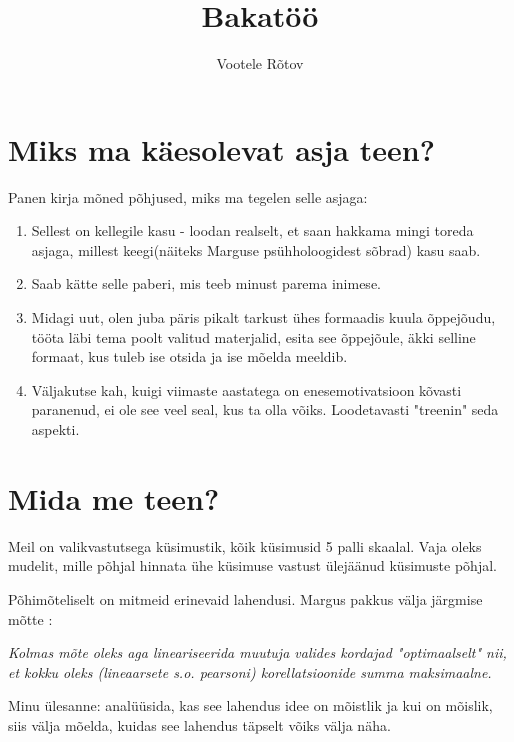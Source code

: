 \documentclass{article}
\author{Vootele Rõtov}
\title{Bakatöö}
\begin{document}
\section*{Miks ma käesolevat asja teen?}

Panen kirja mõned põhjused, miks ma tegelen selle asjaga:
\begin{enumerate}[I]
\item Sellest on kellegile kasu - loodan realselt, et saan hakkama mingi toreda asjaga, millest keegi(näiteks Marguse psühholoogidest sõbrad) kasu saab.
\item Saab kätte selle paberi, mis teeb minust parema inimese. 
\item Midagi uut, olen juba päris pikalt tarkust ühes formaadis kuula õppejõudu, tööta läbi tema poolt valitud materjalid, esita see õppejõule, äkki selline formaat, kus tuleb ise otsida ja ise mõelda meeldib.
\item Väljakutse kah, kuigi viimaste aastatega on enesemotivatsioon kõvasti paranenud, ei ole see veel seal, kus ta olla võiks. Loodetavasti "treenin" seda aspekti.
\end{enumerate}

\section*{Mida me teen?}

Meil on valikvastutsega küsimustik, kõik küsimusid 5 palli skaalal. Vaja oleks mudelit, mille põhjal hinnata ühe küsimuse vastust ülejäänud küsimuste põhjal.

Põhimõteliselt on mitmeid erinevaid lahendusi. Margus pakkus välja järgmise mõtte : 

\textit{Kolmas mõte oleks aga lineariseerida muutuja valides kordajad "optimaalselt" nii, et kokku oleks (lineaarsete s.o. pearsoni) korellatsioonide summa maksimaalne.}

Minu \"ulesanne: analüüsida, kas see lahendus idee on mõistlik ja kui on mõislik, siis välja mõelda, kuidas see lahendus täpselt võiks välja näha. 
\end{document}
